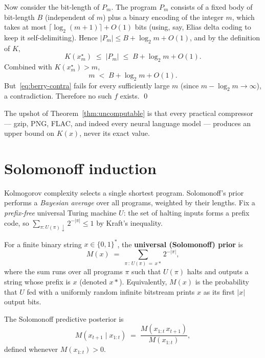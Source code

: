 Now consider the bit-length of $P_m$. The program $P_m$ consists of a
fixed body of bit-length $B$ (independent of $m$) plus a binary encoding
of the integer $m$, which takes at most $\lceil \log_2(m+1)\rceil + O(1)$
bits (using, say, Elias delta coding to keep it self-delimiting). Hence
$|P_m| \le B + \log_2 m + O(1)$, and by the definition of $K$,
\begin{equation}
  K(x_m^\star) \;\le\; |P_m| \;\le\; B + \log_2 m + O(1). \label{eq:berry-upper}
\end{equation}
Combined with $K(x_m^\star) > m$,
\begin{equation}
  m \;<\; B + \log_2 m + O(1). \label{eq:berry-contra}
\end{equation}
But~\eqref{eq:berry-contra} fails for every sufficiently large $m$
(since $m - \log_2 m \to \infty$), a contradiction. Therefore no such
$f$ exists. \qed

The upshot of Theorem~\ref{thm:uncomputable} is that every practical
compressor --- gzip, PNG, FLAC, and indeed every neural language model
--- produces an upper bound on $K(x)$, never its exact value.

\section{Solomonoff induction}
\label{sec:solomonoff}

Kolmogorov complexity selects a single shortest program. Solomonoff's
prior \citep{solomonoff1964formal} performs a \emph{Bayesian average}
over all programs, weighted by their lengths. Fix a
\emph{prefix-free} universal Turing machine $U$: the set of halting
inputs forms a prefix code, so $\sum_{\pi : U(\pi)\downarrow} 2^{-|\pi|}
\le 1$ by Kraft's inequality.

\begin{definition}
\label{def:M}
For a finite binary string $x \in \{0,1\}^*$, the \textbf{universal
(Solomonoff) prior} is
\begin{equation}
  M(x) \;=\; \sum_{\pi \,:\, U(\pi)\, =\, x *} 2^{-|\pi|}, \label{eq:M}
\end{equation}
where the sum runs over all programs $\pi$ such that $U(\pi)$ halts and
outputs a string whose prefix is $x$ (denoted $x*$).
Equivalently, $M(x)$ is the probability that $U$ fed with a uniformly
random infinite bitstream prints $x$ as its first $|x|$ output bits.
\end{definition}

The Solomonoff predictive posterior is
\begin{equation}
  M(x_{t+1} \mid x_{1:t}) \;=\; \frac{M(x_{1:t}\,x_{t+1})}{M(x_{1:t})}, \label{eq:M-posterior}
\end{equation}
defined whenever $M(x_{1:t}) > 0$.

